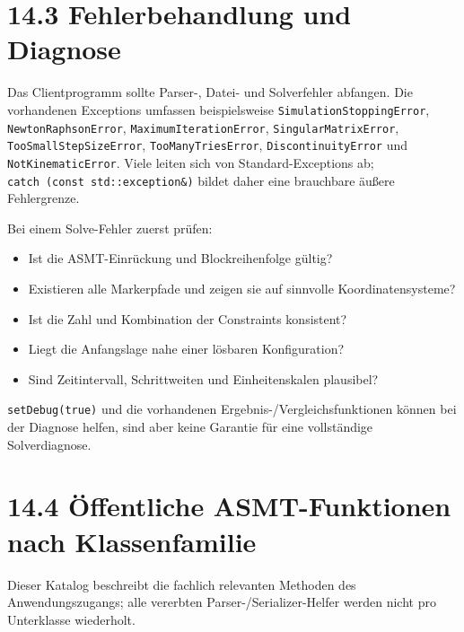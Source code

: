 \documentclass[
  12pt
]{book}
\providecommand{\tightlist}{%
  \setlength{\itemsep}{0pt}\setlength{\parskip}{0pt}}
\begin{document}
\hypertarget{fehlerbehandlung-und-diagnose}{%
\section{\texorpdfstring{{14.3} Fehlerbehandlung und
Diagnose}{14.3 Fehlerbehandlung und Diagnose}}\label{fehlerbehandlung-und-diagnose}}

Das Clientprogramm sollte Parser-, Datei- und Solverfehler abfangen. Die
vorhandenen Exceptions umfassen beispielsweise
\texttt{SimulationStoppingError}, \texttt{NewtonRaphsonError},
\texttt{MaximumIterationError}, \texttt{SingularMatrixError},
\texttt{TooSmallStepSizeError}, \texttt{TooManyTriesError},
\texttt{DiscontinuityError} und \texttt{NotKinematicError}. Viele leiten
sich von Standard-Exceptions ab;
\texttt{catch\ (const\ std::exception\&)} bildet daher eine brauchbare
äußere Fehlergrenze.

Bei einem Solve-Fehler zuerst prüfen:

\begin{itemize}
\tightlist
\item
  Ist die ASMT-Einrückung und Blockreihenfolge gültig?
\item
  Existieren alle Markerpfade und zeigen sie auf sinnvolle
  Koordinatensysteme?
\item
  Ist die Zahl und Kombination der Constraints konsistent?
\item
  Liegt die Anfangslage nahe einer lösbaren Konfiguration?
\item
  Sind Zeitintervall, Schrittweiten und Einheitenskalen plausibel?
\end{itemize}

\texttt{setDebug(true)} und die vorhandenen
Ergebnis-/Vergleichsfunktionen können bei der Diagnose helfen, sind aber
keine Garantie für eine vollständige Solverdiagnose.

\hypertarget{uxf6ffentliche-asmt-funktionen-nach-klassenfamilie}{%
\section{\texorpdfstring{{14.4} Öffentliche ASMT-Funktionen nach
Klassenfamilie}{14.4 Öffentliche ASMT-Funktionen nach Klassenfamilie}}\label{uxf6ffentliche-asmt-funktionen-nach-klassenfamilie}}

Dieser Katalog beschreibt die fachlich relevanten Methoden des
Anwendungszugangs; alle vererbten Parser-/Serializer-Helfer werden nicht
pro Unterklasse wiederholt.
\end{document}
